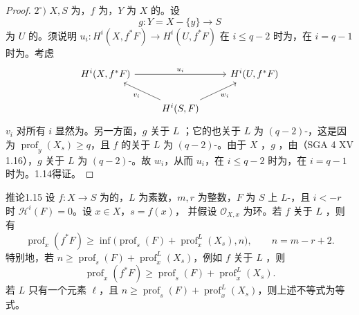 \begin{proof}
$2^\circ)$ $X,S$ 为，$f$ 为，$Y$ 为 $X$ 的。设
\[g:Y=X-\{y\}\longrightarrow S\]
为 $U$ 的。须说明 $u_i:H^i(X,f^*F)\to H^i(U,f^*F)$ 在 $i\leq q-2$ 时为，在 $i=q-1$ 时为。考虑
\[\begin{tikzcd}H^i(X,f^*F)\arrow[rr,"u_i"]&&H^i(U,f^*F)\\&H^i(S,F)\arrow[ul,"v_i"]\arrow[ur,"w_i"']&\end{tikzcd}\]
 $v_i$ 对所有 $i$ 显然为。另一方面，$g$ 关于 $L$ ；它的也关于 $L$ 为 $(q-2)$-，这是因为 $\operatorname{prof}_y(X_s)\geq q$，且 $f$ 的关于 $L$ 为 $(q-2)$-。由于 $X$ ，$g$ ，由（SGA 4 XV 1.16），$g$ 关于 $L$ 为 $(q-2)$-。故 $w_i$，从而 $u_i$，在 $i\leq q-2$ 时为，在 $i=q-1$ 时为。1.14得证。
\end{proof}
\begin{SGAresult}{推论}{1.15}
设 $f:X\to S$ 为的，$L$ 为素数，$m,r$ 为整数，$F$ 为 $S$ 上 $L$-，且 $i<-r$ 时 $\mathcal H^i(F)=0$。设 $x\in X$，$s=f(x)$，
并假设 $\mathcal O_{X,x}$ 为环。若 $f$ 关于 $L$ ，则有
\[\operatorname{prof}_x(f^*F)\geq\inf\bigl(\operatorname{prof}_s(F)+\operatorname{prof}_x^L(X_s),n\bigr),\qquad n=m-r+2.\tag{*}\]
特别地，若 $n\geq\operatorname{prof}_s(F)+\operatorname{prof}_x^L(X_s)$，例如 $f$ 关于 $L$ ，则
\[\operatorname{prof}_x(f^*F)\geq\operatorname{prof}_s(F)+\operatorname{prof}_x^L(X_s).\tag{**}\]
若 $L$ 只有一个元素 $\ell$，且 $n\geq\operatorname{prof}_s(F)+\operatorname{prof}_x^L(X_s)$，则上述不等式为等式。
\end{SGAresult}
